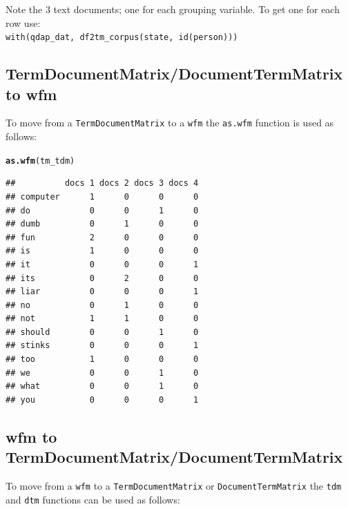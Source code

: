 \documentclass{article}\usepackage[]{graphicx}\usepackage[]{color}
\makeatletter
\newcommand{\hlstd}[1]{\textcolor[rgb]{0.345,0.345,0.345}{#1}}%
\newcommand{\hlkwd}[1]{\textcolor[rgb]{0.737,0.353,0.396}{\textbf{#1}}}%
\newenvironment{kframe}{%
 \def\at@end@of@kframe{}%
 \ifinner\ifhmode%
  \def\at@end@of@kframe{\end{minipage}}%
  \begin{minipage}{\columnwidth}%
 \fi\fi%
 \def\FrameCommand##1{\hskip\@totalleftmargin \hskip-\fboxsep
 \colorbox{shadecolor}{##1}\hskip-\fboxsep
     \hskip-\linewidth \hskip-\@totalleftmargin \hskip\columnwidth}%
 \MakeFramed {\advance\hsize-\width
   \@totalleftmargin\z@ \linewidth\hsize
   \@setminipage}}%
 {\par\unskip\endMakeFramed%
 \at@end@of@kframe}
\newenvironment{knitrout}{}{} %
\makeatother
\begin{document}
\scriptsize\noindent *Note the 3 text documents; one for each grouping variable.  To get one for each row use: \\ \indent \texttt{with(qdap\_dat, df2tm\_corpus(state, id(person)))} \normalsize

\subsection{TermDocumentMatrix/DocumentTermMatrix to wfm}

To move from a \texttt{TermDocumentMatrix} to a \texttt{wfm} the \texttt{as.wfm} function is used as follows:

\begin{knitrout}
\color{fgcolor}\begin{kframe}
\begin{alltt}
\hlkwd{as.wfm}\hlstd{(tm_tdm)}
\end{alltt}
\end{kframe}
\end{knitrout}


\begin{knitrout}
\color{fgcolor}\begin{kframe}
\begin{verbatim}
##          docs 1 docs 2 docs 3 docs 4
## computer      1      0      0      0
## do            0      0      1      0
## dumb          0      1      0      0
## fun           2      0      0      0
## is            1      0      0      0
## it            0      0      0      1
## its           0      2      0      0
## liar          0      0      0      1
## no            0      1      0      0
## not           1      1      0      0
## should        0      0      1      0
## stinks        0      0      0      1
## too           1      0      0      0
## we            0      0      1      0
## what          0      0      1      0
## you           0      0      0      1
\end{verbatim}
\end{kframe}
\end{knitrout}



\subsection{wfm to TermDocumentMatrix/DocumentTermMatrix}

To move from a \texttt{wfm} to a \texttt{TermDocumentMatrix} or \texttt{DocumentTermMatrix} the \texttt{tdm} and \texttt{dtm} functions can be used as follows:
\end{document}
